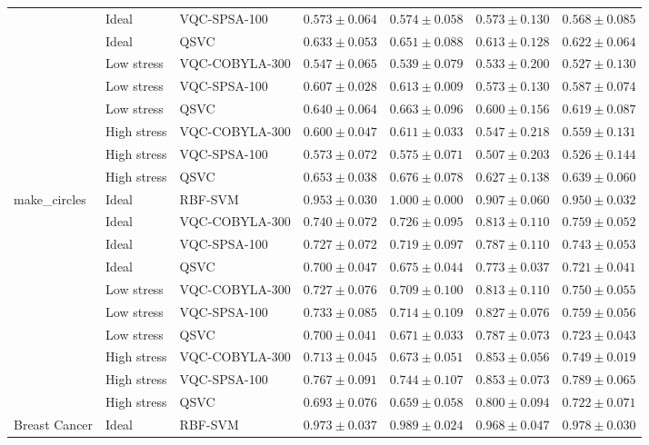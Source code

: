 \documentclass[12pt,a4paper]{article}
\begin{document}
{{\begin{longtable}{lllllll}
 & Ideal & VQC-SPSA-100 & $0.573\pm0.064$ & $0.574\pm0.058$ & $0.573\pm0.130$ & $0.568\pm0.085$ \\
 & Ideal & QSVC & $0.633\pm0.053$ & $0.651\pm0.088$ & $0.613\pm0.128$ & $0.622\pm0.064$ \\
 & Low stress & VQC-COBYLA-300 & $0.547\pm0.065$ & $0.539\pm0.079$ & $0.533\pm0.200$ & $0.527\pm0.130$ \\
 & Low stress & VQC-SPSA-100 & $0.607\pm0.028$ & $0.613\pm0.009$ & $0.573\pm0.130$ & $0.587\pm0.074$ \\
 & Low stress & QSVC & $0.640\pm0.064$ & $0.663\pm0.096$ & $0.600\pm0.156$ & $0.619\pm0.087$ \\
 & High stress & VQC-COBYLA-300 & $0.600\pm0.047$ & $0.611\pm0.033$ & $0.547\pm0.218$ & $0.559\pm0.131$ \\
 & High stress & VQC-SPSA-100 & $0.573\pm0.072$ & $0.575\pm0.071$ & $0.507\pm0.203$ & $0.526\pm0.144$ \\
 & High stress & QSVC & $0.653\pm0.038$ & $0.676\pm0.078$ & $0.627\pm0.138$ & $0.639\pm0.060$ \\
\midrule
make\_circles & Ideal & RBF-SVM & $0.953\pm0.030$ & $1.000\pm0.000$ & $0.907\pm0.060$ & $0.950\pm0.032$ \\
 & Ideal & VQC-COBYLA-300 & $0.740\pm0.072$ & $0.726\pm0.095$ & $0.813\pm0.110$ & $0.759\pm0.052$ \\
 & Ideal & VQC-SPSA-100 & $0.727\pm0.072$ & $0.719\pm0.097$ & $0.787\pm0.110$ & $0.743\pm0.053$ \\
 & Ideal & QSVC & $0.700\pm0.047$ & $0.675\pm0.044$ & $0.773\pm0.037$ & $0.721\pm0.041$ \\
 & Low stress & VQC-COBYLA-300 & $0.727\pm0.076$ & $0.709\pm0.100$ & $0.813\pm0.110$ & $0.750\pm0.055$ \\
 & Low stress & VQC-SPSA-100 & $0.733\pm0.085$ & $0.714\pm0.109$ & $0.827\pm0.076$ & $0.759\pm0.056$ \\
 & Low stress & QSVC & $0.700\pm0.041$ & $0.671\pm0.033$ & $0.787\pm0.073$ & $0.723\pm0.043$ \\
 & High stress & VQC-COBYLA-300 & $0.713\pm0.045$ & $0.673\pm0.051$ & $0.853\pm0.056$ & $0.749\pm0.019$ \\
 & High stress & VQC-SPSA-100 & $0.767\pm0.091$ & $0.744\pm0.107$ & $0.853\pm0.073$ & $0.789\pm0.065$ \\
 & High stress & QSVC & $0.693\pm0.076$ & $0.659\pm0.058$ & $0.800\pm0.094$ & $0.722\pm0.071$ \\
\midrule
Breast Cancer & Ideal & RBF-SVM & $0.973\pm0.037$ & $0.989\pm0.024$ & $0.968\pm0.047$ & $0.978\pm0.030$ \\

\end{longtable}}}
\end{document}
